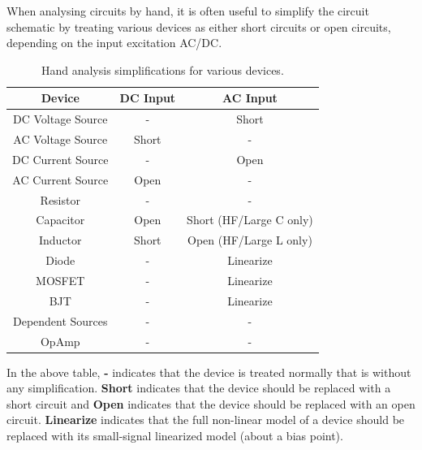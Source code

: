 When analysing circuits by hand, it is often useful to simplify the
circuit schematic by treating various devices as either short circuits
or open circuits, depending on the input excitation AC/DC.\
\begin{table}[H]
    \centering
    \begin{tabular}{|c|c|c|}\hline
      \textbf{Device}   & \textbf{DC Input} & \textbf{AC Input} \\ \hline
      DC Voltage Source & -                 & Short \\ \hline
      AC Voltage Source & Short             & -     \\ \hline
      DC Current Source & -                 & Open  \\ \hline
      AC Current Source & Open              & -     \\ \hline
      Resistor          & -                 & -     \\ \hline
      Capacitor         & Open              & Short (HF/Large C only) \\ \hline
      Inductor          & Short             & Open (HF/Large L only) \\ \hline
      Diode             & -                 & Linearize \\ \hline
      MOSFET            & -                 & Linearize \\ \hline
      BJT               & -                 & Linearize \\ \hline
      Dependent Sources & -                 & -     \\ \hline
      OpAmp             & -                 & -     \\ \hline
    \end{tabular}
    \caption{Hand analysis simplifications for various devices.}\label{tab:hand-analysis-simplifications}
\end{table}

In the above table, \textbf{-} indicates that the device is treated normally
that is without any simplification. \textbf{Short} indicates that the device
should be replaced with a short circuit and \textbf{Open} indicates that the
device should be replaced with an open circuit. \textbf{Linearize} indicates
that the full non-linear model of a device should be replaced with its
small-signal linearized model (about a bias point).
